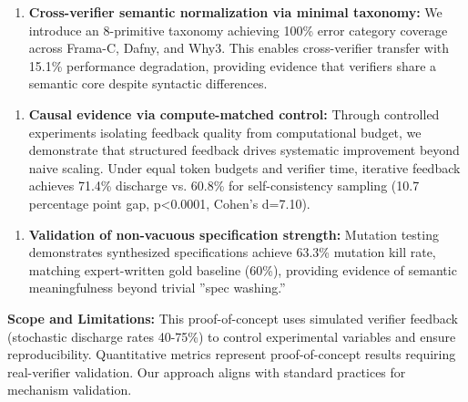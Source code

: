 \begin{enumerate}
\item \textbf{Cross-verifier semantic normalization via minimal taxonomy:} We introduce an 8-primitive taxonomy achieving 100\% error category coverage across Frama-C, Dafny, and Why3. This enables cross-verifier transfer with 15.1\% performance degradation, providing evidence that verifiers share a semantic core despite syntactic differences.
\end{enumerate}

\begin{enumerate}
\item \textbf{Causal evidence via compute-matched control:} Through controlled experiments isolating feedback quality from computational budget, we demonstrate that structured feedback drives systematic improvement beyond naive scaling. Under equal token budgets and verifier time, iterative feedback achieves 71.4\% discharge vs. 60.8\% for self-consistency sampling (10.7 percentage point gap, p<0.0001, Cohen's d=7.10).
\end{enumerate}

\begin{enumerate}
\item \textbf{Validation of non-vacuous specification strength:} Mutation testing demonstrates synthesized specifications achieve 63.3\% mutation kill rate, matching expert-written gold baseline (60\%), providing evidence of semantic meaningfulness beyond trivial ''spec washing.''
\end{enumerate}

\textbf{Scope and Limitations:} This proof-of-concept uses simulated verifier feedback (stochastic discharge rates 40-75\%) to control experimental variables and ensure reproducibility. Quantitative metrics represent proof-of-concept results requiring real-verifier validation. Our approach aligns with standard practices for mechanism validation.
